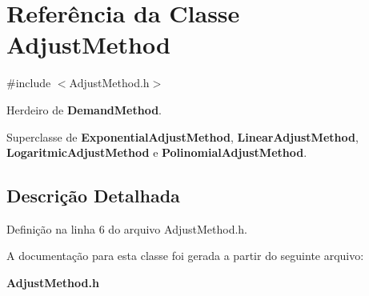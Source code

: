 \section{Referência da Classe Adjust\+Method}
\label{class_adjust_method}


{\ttfamily \#include $<$Adjust\+Method.\+h$>$}



Herdeiro de {\bf Demand\+Method}.



Superclasse de {\bf Exponential\+Adjust\+Method}, {\bf Linear\+Adjust\+Method}, {\bf Logaritmic\+Adjust\+Method} e {\bf Polinomial\+Adjust\+Method}.



\subsection{Descrição Detalhada}


Definição na linha 6 do arquivo Adjust\+Method.\+h.



A documentação para esta classe foi gerada a partir do seguinte arquivo\+:\begin{DoxyCompactItemize}
\item 
{\bf Adjust\+Method.\+h}\end{DoxyCompactItemize}
